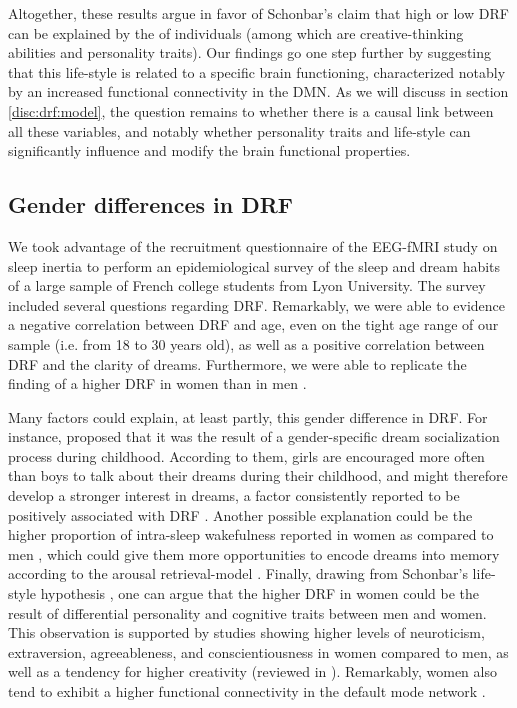 Altogether, these results argue in favor of Schonbar's claim \citeyearpar{schonbar_differential_1965} that high or low DRF can be explained by the  of individuals (among which are creative-thinking abilities and personality traits). Our findings go one step further by suggesting that this life-style is related to a specific brain functioning, characterized notably by an increased functional connectivity in the DMN. As we will discuss in section \ref{disc:drf:model}, the question remains to whether there is a causal link between all these variables, and notably whether personality traits and life-style can significantly influence and modify the brain functional properties.

\subsection{Gender differences in DRF}
\label{disc:drf:summary:survey}

We took advantage of the recruitment questionnaire of the EEG-fMRI study on sleep inertia to perform an epidemiological survey of the sleep and dream habits of a large sample of French college students from Lyon University. The survey included several questions regarding DRF. Remarkably, we were able to evidence a negative correlation between DRF and age, even on the tight age range of our sample (i.e. from 18 to 30 years old), as well as a positive correlation between DRF and the clarity of dreams. Furthermore, we were able to replicate the finding of a higher DRF in women than in men \citep{schredl_gender_2008}.

Many factors could explain, at least partly, this gender difference in DRF. For instance, \citet{schredl_gender_2008} proposed that it was the result of a gender-specific dream socialization process during childhood. According to them, girls are encouraged more often than boys to talk about their dreams during their childhood, and might therefore develop a stronger interest in dreams, a factor consistently reported to be positively associated with DRF \citep{schredl_factors_2003}. Another possible explanation could be the higher proportion of intra-sleep wakefulness reported in women as compared to men \citep{reyner_gender-and_1995}, which could give them more opportunities to encode dreams into memory according to the arousal retrieval-model \citep{koulack_dream_1976}. Finally, drawing from Schonbar's life-style hypothesis \citeyearpar{schonbar_differential_1965}, one can argue that the higher DRF in women could be the result of differential personality and cognitive traits between men and women. This observation is supported by studies showing higher levels of neuroticism, extraversion, agreeableness, and conscientiousness in women compared to men, as well as a tendency for higher creativity (reviewed in \citealp{schmitt_why_2009, baer_gender_2008}). Remarkably, women also tend to exhibit a higher functional connectivity in the default mode network \citep{bluhm_default_2008}.

